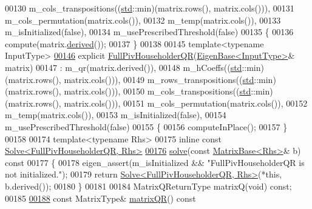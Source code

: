 \begin{DoxyCode}
00130         m\_cols\_transpositions((\hyperlink{namespacestd}{std}::min)(matrix.rows(), matrix.cols())),
00131         m\_cols\_permutation(matrix.cols()),
00132         m\_temp(matrix.cols()),
00133         m\_isInitialized(false),
00134         m\_usePrescribedThreshold(false)
00135     \{
00136       compute(matrix.\hyperlink{group___core___module_a324b16961a11d2ecfd2d1b7dd7946545}{derived}());
00137     \}
00138 
00145     \textcolor{keyword}{template}<\textcolor{keyword}{typename} InputType>
\hyperlink{group___q_r___module_ac9bdb4f7fa77c1aa16f238592c248e70}{00146}     \textcolor{keyword}{explicit} \hyperlink{group___q_r___module_ac9bdb4f7fa77c1aa16f238592c248e70}{FullPivHouseholderQR}(\hyperlink{group___core___module_struct_eigen_1_1_eigen_base}{EigenBase<InputType>}& matrix)
00147       : m\_qr(matrix.derived()),
00148         m\_hCoeffs((\hyperlink{namespacestd}{std}::min)(matrix.rows(), matrix.cols())),
00149         m\_rows\_transpositions((\hyperlink{namespacestd}{std}::min)(matrix.rows(), matrix.cols())),
00150         m\_cols\_transpositions((\hyperlink{namespacestd}{std}::min)(matrix.rows(), matrix.cols())),
00151         m\_cols\_permutation(matrix.cols()),
00152         m\_temp(matrix.cols()),
00153         m\_isInitialized(false),
00154         m\_usePrescribedThreshold(false)
00155     \{
00156       computeInPlace();
00157     \}
00158 
00174     \textcolor{keyword}{template}<\textcolor{keyword}{typename} Rhs>
00175     \textcolor{keyword}{inline} \textcolor{keyword}{const} \hyperlink{group___core___module_class_eigen_1_1_solve}{Solve<FullPivHouseholderQR, Rhs>}
\hyperlink{group___q_r___module_a6f1b0a116c78e642e3d2a100a29d1a4a}{00176}     \hyperlink{group___q_r___module_a6f1b0a116c78e642e3d2a100a29d1a4a}{solve}(\textcolor{keyword}{const} \hyperlink{group___core___module_class_eigen_1_1_matrix_base}{MatrixBase<Rhs>}& b)\textcolor{keyword}{ const}
00177 \textcolor{keyword}{    }\{
00178       eigen\_assert(m\_isInitialized && \textcolor{stringliteral}{"FullPivHouseholderQR is not initialized."});
00179       \textcolor{keywordflow}{return} \hyperlink{group___core___module_class_eigen_1_1_solve}{Solve<FullPivHouseholderQR, Rhs>}(*\textcolor{keyword}{this}, b.derived());
00180     \}
00181 
00184     MatrixQReturnType matrixQ(\textcolor{keywordtype}{void}) \textcolor{keyword}{const};
00185 
\hyperlink{group___q_r___module_a9c16411e5d8f1fc634a5797018d5aa3e}{00188}     \textcolor{keyword}{const} MatrixType& \hyperlink{group___q_r___module_a9c16411e5d8f1fc634a5797018d5aa3e}{matrixQR}()\textcolor{keyword}{ const}

\end{DoxyCode}

